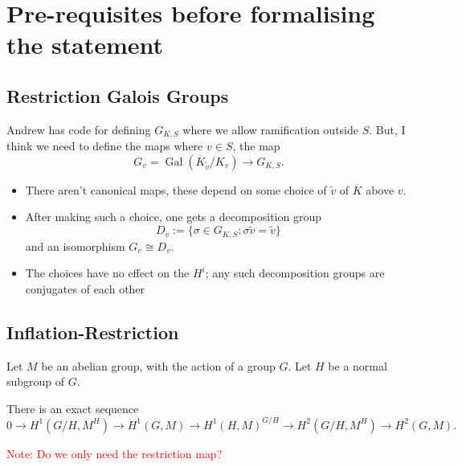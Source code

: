\documentclass[11pt]{article}
\begin{document}

\section{Pre-requisites before formalising the statement}

\subsection{Restriction Galois Groups}

Andrew has code for defining $G_{K, S}$ where we allow ramification outside $S$. But, I think we need to define the maps where $v \in S$, the map
\[
G_v=\operatorname{Gal}(\overline{K}_{\widetilde{v}}/K_v) \to G_{K, S}.
\]

\begin{itemize}
    \item There aren't canonical maps, these depend on some choice of \( \widetilde{v} \) of \( \overline{K} \) above \( v \).
    \item After making such a choice, one gets a decomposition group
    \[
    D_v := \{\sigma \in G_{K,S} : \sigma\widetilde{v} = \widetilde{v} \}
    \]
    and an isomorphism \( G_v\cong D_v \).
    \item The choices have no effect on the \( H^i \); any such decomposition groups are conjugates of each other
\end{itemize}

\subsection{Inflation-Restriction}

Let \( M \) be an abelian group, with the action of a group \( G \). Let \( H \) be a normal subgroup of \( G \).
\begin{prop}
There is an exact sequence
\[
0 \to H^1 (G/H, M^H) \to H^1 (G, M) \to H^1 (H, M)^{G/H} \to H^2 (G/H, M^H) \to H^2 (G, M).
\]
\end{prop}
\textcolor{red}{Note: Do we only need the restriction map?}
\end{document}
